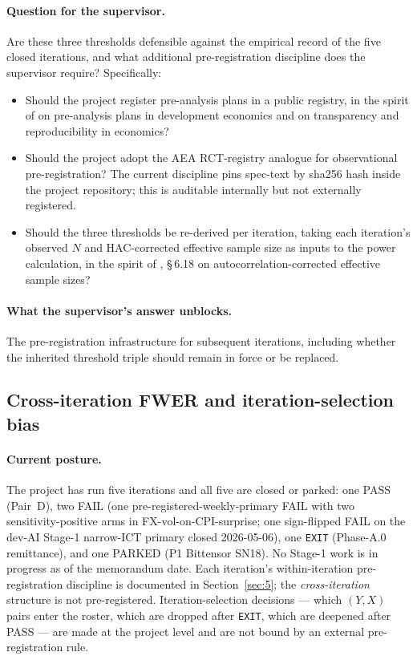 \paragraph{Question for the supervisor.} Are these three thresholds
defensible against the empirical record of the five closed iterations,
and what additional pre-registration discipline does the supervisor
require? Specifically:

\begin{itemize}
  \item Should the project register pre-analysis plans in a public
    registry, in the spirit of \citet{olken_2015} on
    pre-analysis plans in development economics and
    \citet{christensen_miguel_2018} on transparency and reproducibility
    in economics?
  \item Should the project adopt the AEA RCT-registry analogue for
    observational pre-registration? The current discipline pins
    spec-text by sha256 hash inside the project repository; this is
    auditable internally but not externally registered.
  \item Should the three thresholds be re-derived per iteration, taking
    each iteration's observed \(N\) and HAC-corrected effective sample
    size as inputs to the power calculation, in the spirit of
    \citet{hansen_2022}, \S\,6.18 on autocorrelation-corrected effective
    sample sizes?
\end{itemize}

\paragraph{What the supervisor's answer unblocks.} The pre-registration
infrastructure for subsequent iterations, including whether the inherited
threshold triple should remain in force or be replaced.

\subsection{Cross-iteration FWER and iteration-selection bias}\label{sec:7.5}

\paragraph{Current posture.} The project has run five iterations and all
five are closed or parked: one PASS (Pair~D), two FAIL (one
pre-registered-weekly-primary FAIL with two sensitivity-positive arms in
FX-vol-on-CPI-surprise; one sign-flipped FAIL on the dev-AI Stage-1
narrow-ICT primary closed 2026-05-06), one \texttt{EXIT}
(Phase-A.0 remittance), and one PARKED (P1 Bittensor SN18). No Stage-1
work is in progress as of the memorandum date. Each iteration's
within-iteration pre-registration discipline is documented in
Section~\ref{sec:5}; the \emph{cross-iteration} structure is not
pre-registered. Iteration-selection decisions --- which \((Y, X)\) pairs
enter the roster, which are dropped after \texttt{EXIT}, which are
deepened after PASS --- are made at the project level and are not bound
by an external pre-registration rule.

